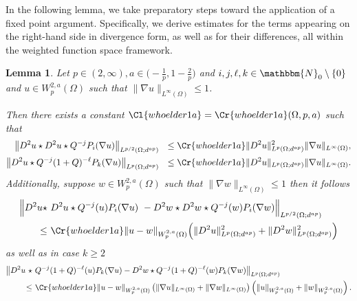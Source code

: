 \documentclass[12pt,a4paper,twoside]{article}
\newcommand{\N}{\mathbbm {N}}
\newtheorem{lemma}[thm]{Lemma}
\begin{document}
In the following lemma, we take preparatory steps toward the application of a fixed point argument. Specifically, we derive estimates for the terms appearing on the right-hand side in divergence form, as well as for their differences, all within the weighted function space framework.

\begin{lemma}\label{lemm:wprem12}
 Let $p\in (2,\infty), a\in \big(-\frac 1p, 1-\frac{2}{p}\big)$  and $ i,j,\ell, k\in\N_0\setminus\{0\}$ and $u\in W^{2,a}_p({\Omega})$ such that $\|\nabla u\|_{L^\infty({\Omega})}\le1$.
 
 Then there exists a  constant $\Cl{whoelder1a}=\Cr{whoelder1a}(\Omega, p,a)$ such that 
 \begin{align}
      \begin{aligned}
    \big\|D^2 u \star D^2  u \star  Q^{-j}P_{i}(\nabla u)  \big\|_{L^{p/2}(\Omega;d^{ap})} 
   \ &\
    \le \Cr{whoelder1a}\| D^2 u \|^2_{L^{p}({\Omega};d^{ap})} \|\nabla u\|_{L^\infty({\Omega})},
    \\
    \big\|D^2 u \star  Q^{-j}(1+Q)^{-\ell}P_{k}(\nabla u)  \big\|_{L^{p}({\Omega};d^{ap})} 
    \ &\  \le \Cr{whoelder1a}  
         \|D^2 u \|_{L^{p}({\Omega};d^{ap})} \|\nabla u  \|_{L ^\infty({\Omega})} 
.
\end{aligned} \label{eq:westvorlp1a} 
 \end{align}
Additionally, suppose $w\in W^{2,a}_p({\Omega})$ such that $\|\nabla w\|_{L^\infty({\Omega})}\le 1$ then it follows
\begin{align}
\begin{aligned}
    \Big\| D^2 u \star &\ D^2  u \star  Q^{-j}(u)P_{i}(\nabla u)  
\    -  D^2 w \star D^2 w  \star  Q^{-j}(w)P_{i}(\nabla w)  \Big\|_{L^{p/2}(\Omega;d^{ap})} 
    \\
    \le &\ \Cr{whoelder1a}   \| u-w \|_{W^{2,a}_p(\Omega)} \Big(  \| D^2u \|_{L^p(\Omega;d^{ap})}^2+ \| D^2w \|_{L^{p}(\Omega;d^{ap})} ^2\Big) 
\end{aligned} \label{eq:westvorlp2a}
\end{align}
as well as in case $k \ge 2$
\begin{align}
      \begin{aligned}
    \big\|D^2 u \ \star    &\ Q^{-j}(1+Q)^{-\ell}(u)P_{k}(\nabla u)
     -
    D^2 w \star  Q^{-j}(1+Q)^{-\ell}(w)P_{k}(\nabla w)  \big\|_{L^{p}({\Omega};d^{ap})} 
    \\
        \le &\ \Cr{whoelder1a}   \|u-w \|_{W^{2,a}_p({\Omega})} 
       \left(
 \|\nabla u\| _{L^\infty({\Omega})} +\|\nabla w\| _{L^\infty({\Omega})} 
               \right)   
               \left(
 \| u\| _{W^{2,a}_p(\Omega)} +\|w\| _{W^{2,a}_p(\Omega)} 
               \right)
.
\end{aligned} \label{eq:westvor21a}
 \end{align}
\end{lemma}
\end{document}
